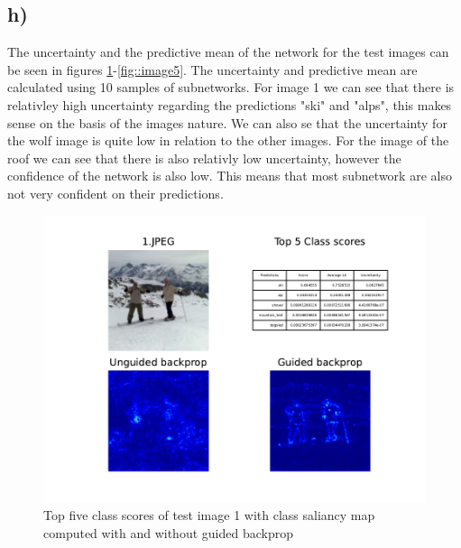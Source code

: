 \documentclass{article}
\begin{document}
\subsection*{h)}
The uncertainty and the predictive mean of the network for the test images can be seen in figures \ref{fig::image1}-\ref{fig::image5}. The uncertainty and predictive mean are calculated using 10 samples of subnetworks. For image 1 we can see that there is relativley high uncertainty regarding the predictions "ski" and "alps", this makes sense on the basis of the images nature. We can also se that the uncertainty for the wolf image is quite low in relation to the other images. For the image of the roof we can see that there is also relativly low uncertainty, however the confidence of the network is also low. This means that most subnetwork are also not very confident on their predictions.
\begin{figure}[h]
    \begin{center}
        \includegraphics{../Task2/Figures/1.JPEG_k10_saliancy_uncertainty.pdf}
        \caption{Top five class scores of test image 1 with class saliancy map computed with and without guided backprop}
        \label{fig::image1}
    \end{center}
\end{figure}
\end{document}
